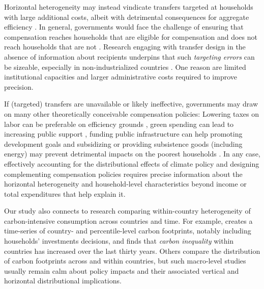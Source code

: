 \documentclass[12pt, a4paper]{article}
\begin{document}
Horizontal heterogeneity may instead vindicate transfers targeted at households with large additional costs, albeit with detrimental consequences for aggregate efficiency \autocite{Hansel.2022}. In general, governments would face the challenge of ensuring that compensation reaches households that are eligible for compensation and does not reach households that are not \autocite[e.g.][]{Hanna.2018}. Research engaging with transfer design in the absence of information about recipients underpins that such \textit{targeting errors} can be sizeable, especially in non-industrialized countries \autocite{WorldBank.2018, Robles.2019}. One reason are limited institutional capacities \autocite[e.g.][]{Besley.2009} and larger administrative costs \autocite{Coady.2004} required to improve precision.

If (targeted) transfers are unavailable or likely ineffective, governments may draw on many other theoretically conceivable compensation policies: Lowering taxes on labor can be preferable on efficiency grounds \autocite{Pearce.1991,Goulder.1995,Bento.2018}, green spending can lead to increasing public support \autocite{Sommer.2022,Kotchen.2017,Dechezlepretre.2022}, funding public infrastructure can help promoting development goals \autocite{Franks.2018,Jakob.2016} and subsidizing or providing subsistence goods (including energy) may prevent detrimental impacts on the poorest households \autocite{Greve.2022,Schaffitzel.2019}. In any case, effectively accounting for the distributional effects of climate policy and designing complementing compensation policies requires precise information about the horizontal heterogeneity and household-level characteristics beyond income or total expenditures that help explain it. 

Our study also connects to research comparing within-country heterogeneity of carbon-intensive consumption across countries and time. For example, \textcite{Chancel.2022b} creates a time-series of country- and percentile-level carbon footprints, notably including households' investments decisions, and finds that \textit{carbon inequality} within countries has increased over the last thirty years. Others \autocite{Oswald.2020,Bruckner.2022} compare the distribution of carbon footprints across and within countries, but such macro-level studies usually remain calm about policy impacts and their associated vertical and horizontal distributional implications.
\end{document}

